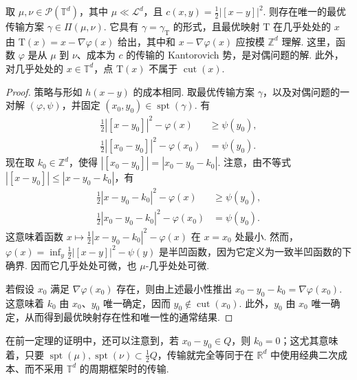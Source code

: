 \label{idx:i137-p20}
\begin{theorem}\label{obj:1.25}
取 $\mu,\nu\in\mathscr P(\mathbb T^d)$，其中 $\mu\ll\mathscr L^d$，且 $c(x,y)=\frac12|[x-y]|^2$. 则存在唯一的最优传输方案 $\gamma\in\Pi(\mu,\nu)$. 它具有 $\gamma=\gamma_\mathrm{T}$ 的形式，且最优映射 $\mathrm{T}$ 在几乎处处的 $x$ 由 $\mathrm{T}(x)=x-\nabla\varphi(x)$ 给出，其中和 $x-\nabla\varphi(x)$ 应按模 $\mathbb Z^d$ 理解. 这里，函数 $\varphi$ 是从 $\mu$ 到 $\nu$、成本为 $c$ 的传输的 Kantorovich 势，是对偶问题的解. 此外，对几乎处处的 $x\in\mathbb T^d$，点 $\mathrm{T}(x)$ 不属于 $\operatorname{cut}(x)$.
\end{theorem}
\begin{proof}
策略与形如 $h(x-y)$ 的成本相同. 取最优传输方案 $\gamma$，以及对偶问题的一对解 $(\varphi,\psi)$，并固定 $(x_0,y_0)\in\operatorname{spt}(\gamma)$. 有
\begin{equation*}
\begin{aligned}
\frac12|[x-y_0]|^2-\varphi(x)&\ge\psi(y_0),\\
\frac12|[x_0-y_0]|^2-\varphi(x_0)&=\psi(y_0).
\end{aligned}
\end{equation*}
现在取 $k_0\in\mathbb Z^d$，使得 $|[x_0-y_0]|=|x_0-y_0-k_0|$. 注意，由不等式 $|[x-y_0]|\le|x-y_0-k_0|$，有
\begin{equation*}
\begin{aligned}
\frac12|x-y_0-k_0|^2-\varphi(x)&\ge\psi(y_0),\\
\frac12|x_0-y_0-k_0|^2-\varphi(x_0)&=\psi(y_0).
\end{aligned}
\end{equation*}
这意味着函数 $x\mapsto\frac12|x-y_0-k_0|^2-\varphi(x)$ 在 $x=x_0$ 处最小. 然而，$\varphi(x)=\inf_y\frac12|[x-y]|^2-\psi(y)$ 是半凹函数，因为它定义为一致半凹函数的下确界. 因而它几乎处处可微，也 $\mu$-几乎处处可微.

若假设 $x_0$ 满足 $\nabla\varphi(x_0)$ 存在，则由上述最小性推出 $x_0-y_0-k_0=\nabla\varphi(x_0)$. 这意味着 $k_0$ 由 $x_0$、$y_0$ 唯一确定，因而 $y_0\notin\operatorname{cut}(x_0)$. 此外，$y_0$ 由 $x_0$ 唯一确定，从而得到最优映射存在性和唯一性的通常结果.
\end{proof}

\begin{remark}\leavevmode\label{obj:1.26}
在前一定理的证明中，还可以注意到，若 $x_0-y_0\in Q$，则 $k_0=0$；这尤其意味着，只要 $\operatorname{spt}(\mu),\operatorname{spt}(\nu)\subset\frac12 Q$，传输就完全等同于在 $\mathbb R^d$ 中使用经典二次成本、而不采用 $\mathbb T^d$ 的周期框架时的传输.
\end{remark}
